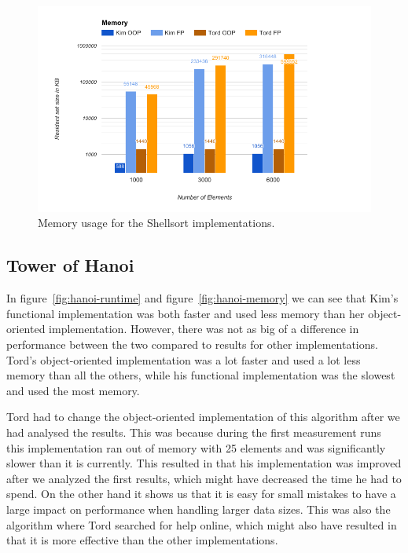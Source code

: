 \documentclass {article}
\begin{document}
\begin{figure}[H]
\centering
\includegraphics[width=\textwidth]{shellsort-memory}

\caption{Memory usage for the Shellsort implementations.}
\label{fig:shellsort-memory}
\end{figure}
\subsection{Tower of Hanoi}
In figure~\ref{fig:hanoi-runtime} and figure~\ref{fig:hanoi-memory} we can see that Kim's functional implementation was both faster and used less memory than her object-oriented implementation. However, there was not as big of a difference in performance between the two compared to results for other implementations. Tord's object-oriented implementation was a lot faster and used a lot less memory than all the others, while his functional implementation was the slowest and used the most memory.

Tord had to change the object-oriented implementation of this algorithm after we had analysed the results. This was because during the first measurement runs this implementation ran out of memory with 25 elements and was significantly slower than it is currently. This resulted in that his implementation was improved after we analyzed the first results, which might have decreased the time he had to spend. On the other hand it shows us that it is easy for small mistakes to have a large impact on performance when handling larger data sizes. This was also the algorithm where Tord searched for help online, which might also have resulted in that it is more effective than the other implementations.
 
\end{document}
